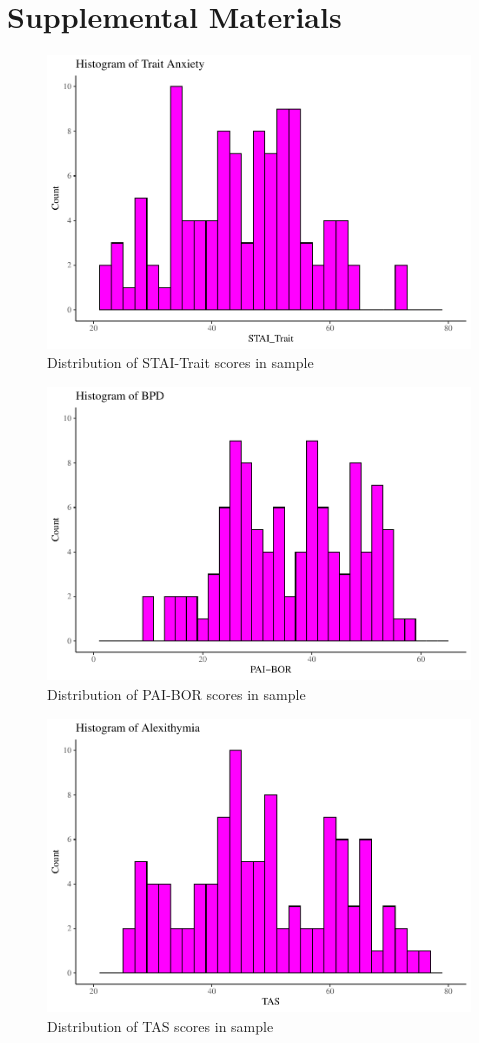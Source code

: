 \documentclass[
  man,floatsintext]{apa7}
\begin{document}
\newpage

\hypertarget{Supplemental-Materials}{%
\section{Supplemental Materials}\label{Supplemental-Materials}}

\begin{figure}[H]
\includegraphics[width=0.7\linewidth]{d2m-Psychopathy_files/figure-latex/STAI-descriptives-1} \caption{Distribution of STAI-Trait scores in sample}\label{fig:STAI-descriptives-appendix}
\end{figure}

\begin{figure}[H]
\includegraphics[width=0.7\linewidth]{d2m-Psychopathy_files/figure-latex/PAI-descriptives-1} \caption{Distribution of PAI-BOR scores in sample}\label{fig:PAIBOR-descriptives-appendix}
\end{figure}

\begin{figure}[H]
\includegraphics[width=0.7\linewidth]{d2m-Psychopathy_files/figure-latex/TAS-descriptives-1} \caption{Distribution of TAS scores in sample}\label{fig:TAS-descriptives-appendix}
\end{figure}
\end{document}
